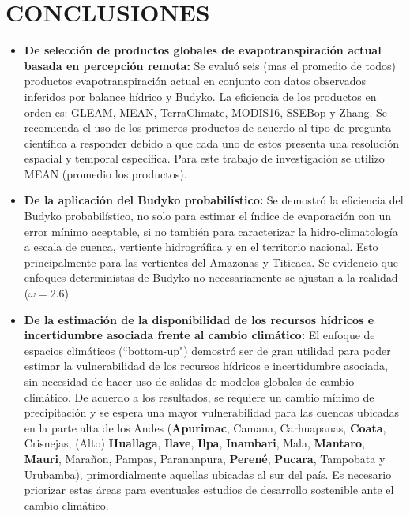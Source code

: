 \documentclass[12pt]{article}
\begin{document}


\clearpage
\vspace*{0.5mm}
\section{CONCLUSIONES}

\begin{itemize}
    \item \textbf{De selección de productos globales de evapotranspiración actual basada en percepción remota:} Se evaluó seis (mas el promedio de todos) productos evapotranspiración actual en conjunto con datos observados inferidos por balance hídrico y Budyko. La eficiencia de los productos en orden es: GLEAM, MEAN, TerraClimate, MODIS16, SSEBop y Zhang. Se recomienda el uso de los primeros productos de acuerdo al tipo de pregunta científica a responder debido a que cada uno de estos presenta una resolución espacial y temporal especifica. Para este trabajo de investigación se utilizo MEAN (promedio los productos).
   
    \item \textbf{De la aplicación del Budyko probabilístico:}
    Se demostró la eficiencia del Budyko probabilístico, no solo para estimar el índice de evaporación con un error mínimo aceptable, si no también para caracterizar la hidro-climatología a escala de cuenca, vertiente hidrográfica y en el territorio nacional. Esto principalmente para las vertientes del Amazonas y Titicaca. Se evidencio que enfoques deterministas de Budyko no necesariamente se ajustan a la realidad ($\omega = 2.6$)
    
    \item \textbf{De la estimación de la disponibilidad de los recursos hídricos e incertidumbre asociada frente al cambio climático:} El enfoque de espacios climáticos (“bottom-up") demostró ser de gran utilidad para poder estimar la vulnerabilidad de los recursos hídricos e incertidumbre asociada, sin necesidad de hacer uso de salidas de modelos globales de cambio climático. De acuerdo a los resultados, se requiere un cambio mínimo de precipitación y se espera una mayor vulnerabilidad para las cuencas ubicadas en la parte alta de los Andes (\textbf{Apurimac}, Camana, Carhuapanas, \textbf{Coata}, Crisnejas, (Alto) \textbf{Huallaga}, \textbf{Ilave}, \textbf{Ilpa}, \textbf{Inambari}, Mala, \textbf{Mantaro}, \textbf{Mauri}, Marañon, Pampas, Parananpura, \textbf{Perené}, \textbf{Pucara}, Tampobata y Urubamba), primordialmente aquellas ubicadas al sur del país. Es necesario priorizar estas áreas para eventuales estudios de desarrollo sostenible ante el cambio climático.
    
\end{itemize}
\end{document}
